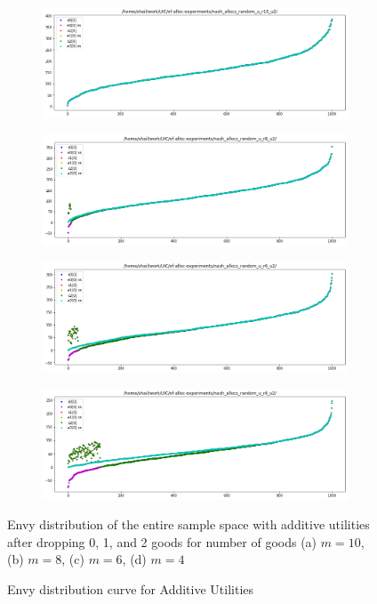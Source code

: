 \begin{figure}[h!]
  \centering
  \begin{subfigure}[b]{0.47\linewidth}
    \includegraphics[width=\linewidth]{images/add/pdf_additive_10.png}
    \caption{}
  \end{subfigure}
  \begin{subfigure}[b]{0.47\linewidth}
    \includegraphics[width=\linewidth]{images/add/pdf_additive_8.png}
    \caption{}
  \end{subfigure}
  \begin{subfigure}[b]{0.47\linewidth}
    \includegraphics[width=\linewidth]{images/add/pdf_additive_6.png}
    \caption{}
  \end{subfigure}
  \begin{subfigure}[b]{0.47\linewidth}
    \includegraphics[width=\linewidth]{images/add/pdf_additive_4.png}
    \caption{}
  \end{subfigure}
  \caption{Envy distribution curve for Additive Utilities}
  \label{fig:efk}
  \small
    Envy distribution of the entire sample space with additive utilities after dropping 0, 1, and 2 goods for number of goods (a) $m = 10$, (b) $m = 8$, (c) $m = 6$, (d) $m = 4$
\end{figure}


